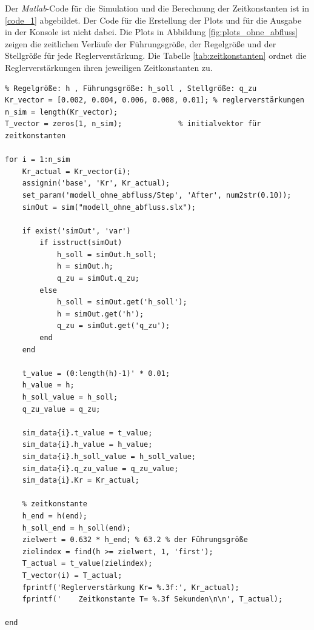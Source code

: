 Der \textit{Matlab}-Code für die Simulation und die Berechnung der Zeitkonstanten ist in \ref{code_1} abgebildet. Der Code für die Erstellung der Plots und für die Ausgabe in der Konsole ist nicht dabei. Die Plots in Abbildung \ref{fig:plots_ohne_abfluss} zeigen die zeitlichen Verläufe der Führungsgröße, der Regelgröße und der Stellgröße für jede Reglerverstärkung. Die Tabelle \ref{tab:zeitkonstanten} ordnet die Reglerverstärkungen ihren jeweiligen Zeitkonstanten zu.

\begin{sourcecode}
    \caption{\textit{Matlab}-Code zur Simulation und Berechnung der Zeitkonstanten}
    \begin{verbatim}
% Regelgröße: h , Führungsgröße: h_soll , Stellgröße: q_zu
Kr_vector = [0.002, 0.004, 0.006, 0.008, 0.01]; % reglerverstärkungen
n_sim = length(Kr_vector);
T_vector = zeros(1, n_sim);             % initialvektor für zeitkonstanten

for i = 1:n_sim
    Kr_actual = Kr_vector(i);
    assignin('base', 'Kr', Kr_actual); 
    set_param('modell_ohne_abfluss/Step', 'After', num2str(0.10));
    simOut = sim("modell_ohne_abfluss.slx");

    if exist('simOut', 'var')
        if isstruct(simOut)
            h_soll = simOut.h_soll;
            h = simOut.h;
            q_zu = simOut.q_zu;
        else
            h_soll = simOut.get('h_soll');
            h = simOut.get('h');
            q_zu = simOut.get('q_zu');
        end
    end

    t_value = (0:length(h)-1)' * 0.01;  
    h_value = h;
    h_soll_value = h_soll;
    q_zu_value = q_zu;

    sim_data{i}.t_value = t_value;
    sim_data{i}.h_value = h_value;
    sim_data{i}.h_soll_value = h_soll_value;
    sim_data{i}.q_zu_value = q_zu_value;
    sim_data{i}.Kr = Kr_actual;

    % zeitkonstante
    h_end = h(end);
    h_soll_end = h_soll(end);
    zielwert = 0.632 * h_end; % 63.2 % der Führungsgröße
    zielindex = find(h >= zielwert, 1, 'first');
    T_actual = t_value(zielindex);
    T_vector(i) = T_actual; 
    fprintf('Reglerverstärkung Kr= %.3f:', Kr_actual);
    fprintf('    Zeitkonstante T= %.3f Sekunden\n\n', T_actual);

end
    \end{verbatim}
\label{code_1}
\end{sourcecode}

